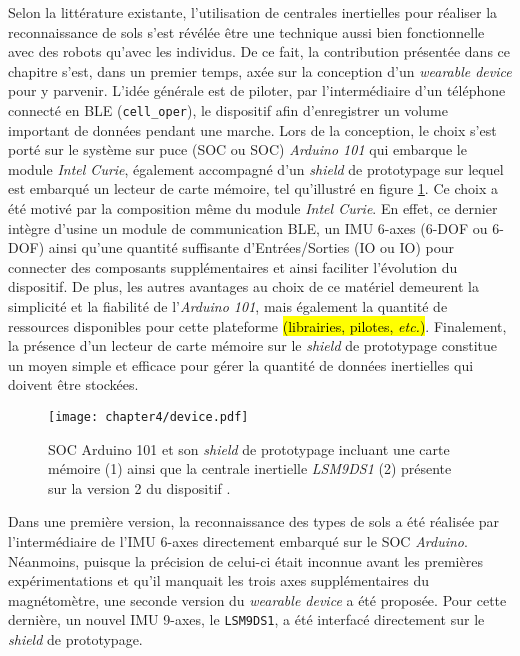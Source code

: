 Selon la littérature existante, l'utilisation de centrales inertielles pour réaliser la reconnaissance de sols s'est révélée être une technique aussi bien fonctionnelle avec des robots qu'avec les individus. De ce fait, la contribution présentée dans ce chapitre s'est, dans un premier temps, axée sur la conception d'un \textit{wearable device} pour y parvenir. L'idée générale est de piloter, par l'intermédiaire d'un téléphone connecté en \acs{BLE} (\texttt{cell\_oper}), le dispositif afin d'enregistrer un volume important de données pendant une marche. Lors de la conception, le choix s'est porté sur le système sur puce (\acl{SOC} ou \acs{SOC}) \textit{Arduino 101} qui embarque le module \textit{Intel Curie}, également accompagné d'un \textit{shield} de prototypage sur lequel est embarqué un lecteur de carte mémoire, tel qu'illustré en figure \ref{fig:device}. Ce choix a été motivé par la composition même du module \textit{Intel Curie}. En effet, ce dernier intègre d'usine un module de communication \acs{BLE}, un \acs{IMU} 6-axes (6-\acl{DOF} ou 6-\acs{DOF}) ainsi qu'une quantité suffisante d'Entrées/Sorties (\acl{IO} ou \acs{IO}) pour connecter des composants supplémentaires et ainsi faciliter l'évolution du dispositif. De plus, les autres avantages au choix de ce matériel demeurent la simplicité et la fiabilité de l'\textit{Arduino 101}, mais également la quantité de ressources disponibles pour cette plateforme \hl{(librairies, pilotes, \textit{etc.})}. Finalement, la présence d'un lecteur de carte mémoire sur le \textit{shield} de prototypage constitue un moyen simple et efficace pour gérer la quantité de données inertielles qui doivent être stockées.

\begin{figure}[H]
	\centering
	\texttt{[image: chapter4/device.pdf]}
        \caption[\acs{SOC} Arduino 101 et son \textit{shield} de prototypage incluant une carte mémoire (1) ainsi que la centrale inertielle \textit{LSM9DS1} (2) présente sur la version 2 du dispositif.]{\acs{SOC} Arduino 101 et son \textit{shield} de prototypage incluant une carte mémoire (1) ainsi que la centrale inertielle \textit{LSM9DS1} (2) présente sur la version 2 du dispositif \citep{Thullier2017}.}
	\label{fig:device}
\end{figure}

Dans une première version, la reconnaissance des types de sols a été réalisée par l'intermédiaire de l'IMU 6-axes directement embarqué sur le \acs{SOC} \textit{Arduino}. Néanmoins, puisque la précision de celui-ci était inconnue avant les premières expérimentations et qu'il manquait les trois axes supplémentaires du magnétomètre, une seconde version du \textit{wearable device} a été proposée. Pour cette dernière, un nouvel IMU 9-axes, le \texttt{LSM9DS1}, a été interfacé directement sur le \textit{shield} de prototypage.

